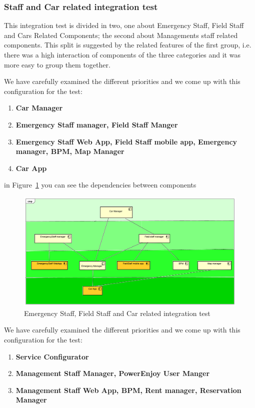 \documentclass[english]{article}
\begin{document}
		\subsubsection{Staff and Car related integration test}
			This integration test is divided in two, one about Emergency Staff, Field Staff and Cars Related Components;
			the second about Managements staff related components. This split is suggested by the related features of the first group, i.e. there was a high interaction of components of the three categories and it was more easy to group them together.
			
			We have carefully examined the different priorities and we come up with this configuration for the test:
			\begin{enumerate}
				\item \textbf{Car Manager} 
				\item \textbf{Emergency Staff manager, Field Staff Manger} 
				\item \textbf{Emergency Staff Web App, Field Staff mobile app,  Emergency manager, BPM, Map Manager}
				\item \textbf{Car App} 
			\end{enumerate}
			in Figure~\ref{fig:staffandcar} you can see the dependencies between components  
			\begin{figure}[H]
				\centering
				\includegraphics[scale=0.3]{./testingOrganization/staff_car.pdf}%
				\caption{Emergency Staff, Field Staff and Car related integration test}
				\label{fig:staffandcar}
			\end{figure}
			
			We have carefully examined the different priorities and we come up with this configuration for the test:
			\begin{enumerate}
				\item \textbf{Service Configurator} 
				\item \textbf{Management Staff Manager, PowerEnjoy User Manger} 
				\item \textbf{Management Staff Web App, BPM, Rent manager, Reservation Manager}
			\end{enumerate}
			
\end{document}
